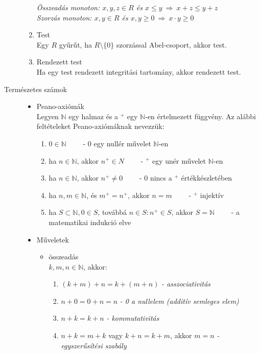 \documentclass[margin=0px]{article}
\newcommand{\N}{\mathbb{N}}
\begin{document}
\begin{description}
\begin{enumerate}
								\textit{Összeadás monoton: $x,y,z \in R$ és $x \leq y \ \Rightarrow \ x+z \leq y+z$ \\ 
									Szorzás monoton: $x,y \in R$ és $x,y\geq0 \ \Rightarrow \ x\cdot y \geq 0$ }
							\item Test \\
								Egy $R$ gyűrűt, ha $R\setminus\{0\}$ szorzással Abel-csoport, akkor test.
							\item Rendezett test \\
								Ha egy test rendezett integritási tartomány, akkor rendezett test.
						\end{enumerate}
					\item[Természetes számok]\hfill
						\begin{itemize}
							\item Peano-axiómák \\
								Legyen $\N$ egy halmaz és a $^+$ egy $\N$-en értelmezett függvény. Az alábbi feltételeket Peano-axiómáknak nevezzük:
								\begin{enumerate}
									\item $0 \in \N \qquad$ - $0$ egy nullér művelet $\N$-en
									\item ha $n \in \N$, akkor $n^+ \in N \qquad$ - $^+$ egy unér művelet $\N$-en
									\item ha $n \in \N$, akkor $n^+ \neq 0 \qquad $ - $0$ nincs a $^+$ értékkészletében
									\item ha $n,m \in \N$, és $m^+ = n^+$, akkor $n = m \qquad $ - $^+$ injektív
									\item ha $S \subset \N, 0 \in S$, továbbá $ n \in S : n^+\in S$, akkor $S = \N \qquad $ - a matematikai indukció elve  
								\end{enumerate}
							\item Műveletek
								\begin{itemize}
									\item összeadás \\
										$k,m,n \in \N$, akkor:
										\begin{enumerate}
											\item $(k+m)+n = k+(m+n)$ \textit{- asszociativitás}
											\item $n+0 = 0+n = n$ \textit{- 0 a nullelem (additív semleges elem)}
											\item $n+k = k+n$ \textit{- kommutativitás}
											\item $n+k = m+k$ vagy $k+n = k+m$, akkor $m=n$ \textit{- egyszerűsítési szabály}

\end{enumerate}
\end{itemize}
\end{itemize}
\end{description}
\end{document}
